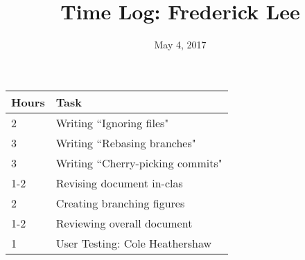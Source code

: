 \documentclass{article}
\title{Time Log: Frederick Lee}
\date{May 4, 2017}
\begin{document}
\maketitle

\begin{table}[h]
\centering
\label{my-label}
\begin{tabular}{ll}
\textbf{Hours} & \textbf{Task}            \\ \hline
2     & Writing ``Ignoring files"         \\
3     & Writing ``Rebasing branches"      \\
3     & Writing ``Cherry-picking commits" \\
1-2   & Revising document in-clas         \\
2     & Creating branching figures        \\
1-2   & Reviewing overall document        \\
1     & User Testing: Cole Heathershaw    \\
\end{tabular}
\end{table}
\end{document}
